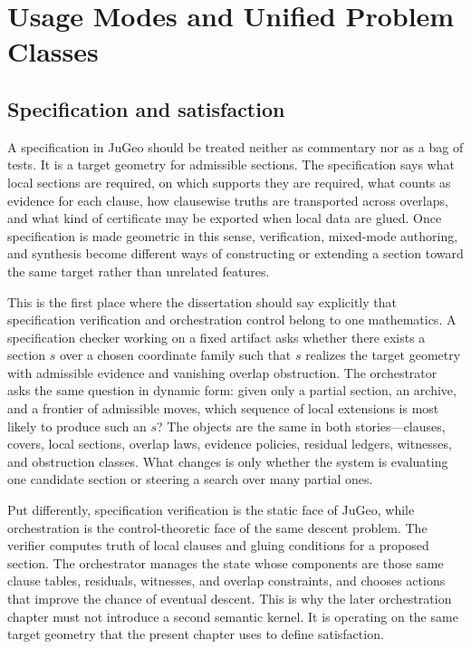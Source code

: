 \documentclass[11pt]{report}
\begin{document}
\part{Usage Modes and Unified Problem Classes}
\chapter{Specification and satisfaction}
A specification in JuGeo should be treated neither as commentary nor as a bag of tests. It is a target geometry for admissible sections. The specification says what local sections are required, on which supports they are required, what counts as evidence for each clause, how clausewise truths are transported across overlaps, and what kind of certificate may be exported when local data are glued. Once specification is made geometric in this sense, verification, mixed-mode authoring, and synthesis become different ways of constructing or extending a section toward the same target rather than unrelated features.

This is the first place where the dissertation should say explicitly that specification verification and orchestration control belong to one mathematics. A specification checker working on a fixed artifact asks whether there exists a section $s$ over a chosen coordinate family such that $s$ realizes the target geometry with admissible evidence and vanishing overlap obstruction. The orchestrator asks the same question in dynamic form: given only a partial section, an archive, and a frontier of admissible moves, which sequence of local extensions is most likely to produce such an $s$? The objects are the same in both stories---clauses, covers, local sections, overlap laws, evidence policies, residual ledgers, witnesses, and obstruction classes. What changes is only whether the system is evaluating one candidate section or steering a search over many partial ones.

Put differently, specification verification is the static face of JuGeo, while orchestration is the control-theoretic face of the same descent problem. The verifier computes truth of local clauses and gluing conditions for a proposed section. The orchestrator manages the state whose components are those same clause tables, residuals, witnesses, and overlap constraints, and chooses actions that improve the chance of eventual descent. This is why the later orchestration chapter must not introduce a second semantic kernel. It is operating on the same target geometry that the present chapter uses to define satisfaction.
\end{document}
